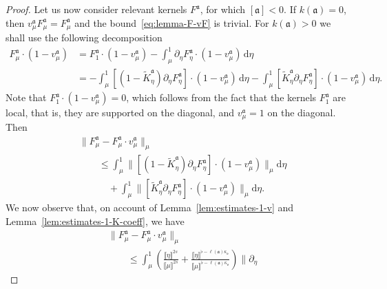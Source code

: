 \documentclass{article}
\numberwithin{equation}{section}
\newcommand{\mathd}{\mathrm{d}}
\theoremstyle{plain}
\theoremstyle{definition}
\begin{document}
\begin{proof}
  Let us now consider relevant kernels $F^{\mathfrak{a}}$, for which
  $[\mathfrak{a}] < 0$. If $k (\mathfrak{a}) = 0$, then
  $v^{\mathfrak{a}}_{\mu} F^{\mathfrak{a}}_{\mu} = F^{\mathfrak{a}}_{\mu}$ and
  the bound~\eqref{eq:lemma-F-vF} is trivial. For $k (\mathfrak{a}) > 0$ we
  shall use the following decomposition
  \[
    \begin{aligned}
      F^{\mathfrak{a}}_{\mu} \cdot (1 - v^{\mathfrak{a}}_{\mu}) &=
      F^{\mathfrak{a}}_1 \cdot (1 - v^{\mathfrak{a}}_{\mu}) - \int_{\mu}^1
      \partial_{\eta} F^{\mathfrak{a}}_{\eta} \cdot (1 -
      v^{\mathfrak{a}}_{\mu})\,\mathd \eta\\
      & = - \int_{\mu}^1 [(1 - \tilde{K}^{\mathfrak{a}}_{\eta})
      \partial_{\eta} F^{\mathfrak{a}}_{\eta}] \cdot (1 -
      v^{\mathfrak{a}}_{\mu})\,\mathd \eta - \int_{\mu}^1
      [\tilde{K}^{\mathfrak{a}}_{\eta} \partial_{\eta}
      F^{\mathfrak{a}}_{\eta}] \cdot (1 - v^{\mathfrak{a}}_{\mu})\,\mathd \eta
      .
    \end{aligned}
  \]
  Note that $F^{\mathfrak{a}}_1 \cdot (1 -
  v^{\mathfrak{a}}_{\mu}) = 0$, which follows from the fact that the kernels
  $F_1^{\mathfrak{a}}$ are local, that is, they are supported on the diagonal, and
  $v^{\mathfrak{a}}_{\mu} = 1$ on the diagonal. Then
  \begin{align*}
     &\| F^{\mathfrak{a}}_{\mu} - F^{\mathfrak{a}}_{\mu} \cdot
     v^{\mathfrak{a}}_{\mu} \|_{\mu}\\
     &\qquad \leqslant \int_{\mu}^1 \| [(1 -
     \tilde{K}^{\mathfrak{a}}_{\eta}) \partial_{\eta} F^{\mathfrak{a}}_{\eta}]
     \cdot (1 - v^{\mathfrak{a}}_{\mu}) \|_{\mu} \mathd \eta\\
     &\qquad\quad + \int_{\mu}^1 \|
     [\tilde{K}^{\mathfrak{a}}_{\eta} \partial_{\eta} F^{\mathfrak{a}}_{\eta}]
     \cdot (1 - v^{\mathfrak{a}}_{\mu}) \|_{\mu} \mathd \eta .
  \end{align*}
  We now observe that, on account of Lemma~\ref{lem:estimates-1-v} and
  Lemma~\ref{lem:estimates-1-K-coeff}, we have
  \begin{align*}
     &\| F^{\mathfrak{a}}_{\mu} - F^{\mathfrak{a}}_{\mu} \cdot
     v^{\mathfrak{a}}_{\mu} \|_{\mu}\\
     &\qquad \leqslant \int_{\mu}^1 \left(
     \frac{\llbracket \eta \rrbracket^{2 s}}{\llbracket \mu \rrbracket^{2 s}}
     + \frac{\llbracket \eta \rrbracket^{\flat - \ell
     (\mathfrak{a}) \kappa_{\mathfrak{o}}}}{\llbracket \mu \rrbracket^{\flat -
     \ell (\mathfrak{a}) \kappa_{\mathfrak{o}}}} \right)  \| \partial_{\eta}

\end{align*}
\end{proof}
\end{document}

